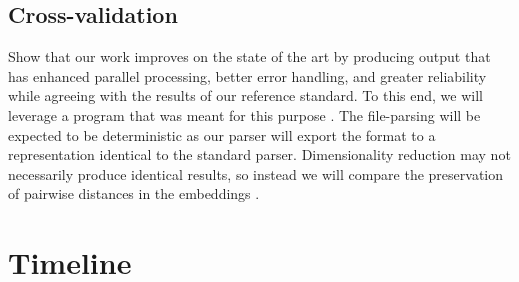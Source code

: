 \documentclass[10pt,letterpaper]{article}
\begin{document}
\begin{multicols}{2}
\subsection{Cross-validation}

Show that our work improves on the state of the art by producing
output that has enhanced parallel processing, better error handling,
and greater reliability while agreeing with the results of our
reference standard. To this end, we will leverage a program that was
meant for this purpose \parencite{vieth2019systematic}. The
file-parsing will be expected to be deterministic as our parser will
export the format to a representation identical to the standard
parser. Dimensionality reduction may not necessarily produce identical
results, so instead we will compare the preservation of pairwise
distances in the embeddings \parencite{becht2019dimensionality}.

\section{Timeline}


\end{multicols}
\end{document}
